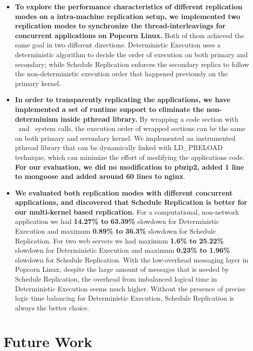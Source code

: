 \begin{itemize}
\item \textbf{To explore the performance characteristics of different replication modes on a intra-machine replication setup, we implemented two replication modes to synchronize the thread-interleavings for concurrent applications on Popcorn Linux.} Both of them achieved the same goal in two different directions: Deterministic Execution uses a deterministic algorithm to decide the order of execution on both primary and secondary; while Schedule Replication enforces the secondary replica to follow the non-deterministic execution order that happened previously on the primary kernel. 

\item \textbf{In order to transparently replicating the applications, we have implemented a set of runtime support to eliminate the non-determinism inside pthread library.} By wrapping a code section with \detstart\ and \detend\ system calls, the execution order of wrapped sections can be the same on both primary and secondary kernel. We implemented an instrumented pthread library that can be dynamically linked with LD\_PRELOAD technique, which can minimize the effort of modifying the applications code. \textbf{For our evaluation, we did no modification to pbzip2, added 1 line to mongoose and added around 60 lines to nginx}.

\item \textbf{We evaluated both replication modes with different concurrent applications, and discovered that Schedule Replication is better for our multi-kernel based replication.} For a computational, non-network application we had \textbf{14.27\% to 63.39\%} slowdown for Deterministic Execution and maximum \textbf{0.89\% to 36.3\%} slowdown for Schedule Replication. For two web servers we had maximum \textbf{1.6\% to 25.22\%} slowdown for Deterministic Execution and maximum \textbf{0.23\% to 1.96\%} slowdown for Schedule Replication. With the low-overhead messaging layer in Popcorn Linux, despite the large amount of messages that is needed by Schedule Replication, the overhead from imbalanced logical time in Deterministic Execution seems much higher. Without the presence of precise logic time balancing for Deterministic Execution, Schedule Replication is always the better choice.

\end{itemize}
\section{Future Work}
